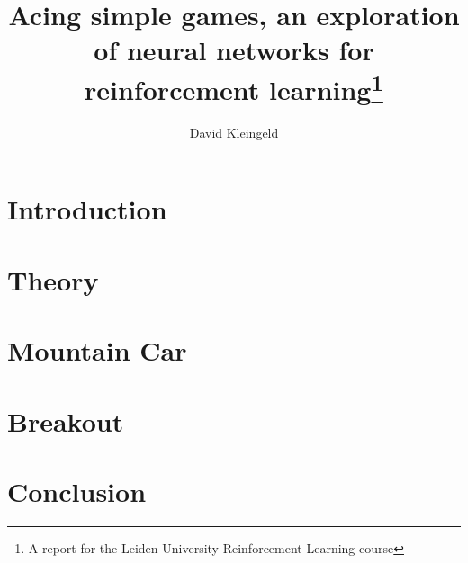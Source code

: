 \documentclass{mimosis}
\title{Acing simple games, an exploration of neural networks for reinforcement learning\thanks{A report for the Leiden University Reinforcement Learning course}}
\author{David Kleingeld}
\begin{document}
\maketitle%

\tableofcontents

\section{Introduction}

\clearpage
\section{Theory}

\section{Mountain Car}


\clearpage
\section{Breakout}


\clearpage
\section{Conclusion}

\clearpage
\begin{appendices}
    
\end{appendices}

\newpage
\renewcommand{\bibname}{References}

 

\end{document}
